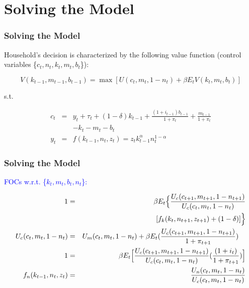 \documentclass[handout]{beamer}
\begin{document}
\section{Solving the Model}

\begin{frame}
\frametitle{Solving the Model} 

Household's decision is characterized by the following value
function (control variables
\{$c_{t},n_{t},k_{t},m_{t},b_{t}$\}): %

\begin{equation}\label{Eq5.11}
V(k_{t-1},m_{t-1},b_{t-1})= \max [U(c_{t},m_{t},1-n_{t})+\beta
E_{t}V(k_{t},m_{t},b_{t})]
\end{equation}

s.t.

\begin{eqnarray*}
c_{t} &=& y_{t}+\tau_{t}+(1-\delta)k_{t-1}
+\frac{(1+i_{t-1})b_{t-1}}{1+\pi_{t}} +\frac{m_{t-1}}{1+\pi_{t}}
\\
&& - k_{t} - m_{t} - b_{t} \\
y_{t} &=&
f(k_{t-1},n_{t},z_{t})=z_{t}k_{t-1}^{\alpha}n_{t}^{1-\alpha}
\end{eqnarray*}

\end{frame}


\begin{frame}
\frametitle{Solving the Model}

\textcolor{blue}{FOCs w.r.t. \{$k_{t},m_{t},b_{t},n_{t}$\}:}

{\scriptsize{
\begin{eqnarray}
1 &=& \beta E_{t}
\Bigl\{\frac{U_{c}(c_{t+1},m_{t+1},1-n_{t+1})}{U_{c}(c_{t},m_{t},1-n_{t})}
\nonumber \\ && [f_{k}(k_{t},n_{t+1},z_{t+1}) + (1-\delta)] \Bigr\} \label{Eq5.12b} \\
 U_{c}(c_{t},m_{t},1-n_{t}) &=& U_{m}(c_{t},m_{t},1-n_{t}) + \beta E_{t}
(\frac{U_{c}(c_{t+1},m_{t+1},1-n_{t+1})}{1+\pi_{t+1}})\label{Eq5.13} ~~~ \\
1 &=&  \beta E_{t} \Bigl[\frac{U_{c}(c_{t+1},m_{t+1},1-n_{t+1})}{U_{c}(c_{t},m_{t},1-n_{t})}(\frac{(1+i_{t})}{1+\pi_{t+1}}) \Bigr] \label{Eq5.14}\\
f_{n}(k_{t-1},n_{t},z_{t}) &=& \frac{U_{n}(c_{t},m_{t},1-n_{t})}{
U_{c}(c_{t},m_{t},1-n_{t})}\label{Eq5.15}
\end{eqnarray}
}}


\end{frame}
\end{document}
